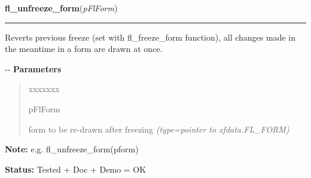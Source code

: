     \label{xformslib:flbasic:fl_unfreeze_form}

    \vspace{0.5ex}

\hspace{.8\funcindent}\begin{boxedminipage}{\funcwidth}

    \raggedright \textbf{fl\_unfreeze\_form}(\textit{pFlForm})

    \vspace{-1.5ex}

    \rule{\textwidth}{0.5\fboxrule}
\setlength{\parskip}{2ex}

Reverts previous freeze (set with fl\_freeze\_form function), all
changes made in the meantime in a form are drawn at once.

-{}-
\setlength{\parskip}{1ex}
      \textbf{Parameters}
      \vspace{-1ex}

      \begin{quote}
        \begin{Ventry}{xxxxxxx}

          \item[pFlForm]


form to be re-drawn after freezing
            {\it (type=pointer to xfdata.FL\_FORM)}

        \end{Ventry}

      \end{quote}

\textbf{Note:} 
e.g. fl\_unfreeze\_form(pform)


\textbf{Status:} 
Tested + Doc + Demo = OK


    \end{boxedminipage}

    \label{xformslib:flbasic:fl_deactivate_form}

    \vspace{0.5ex}

